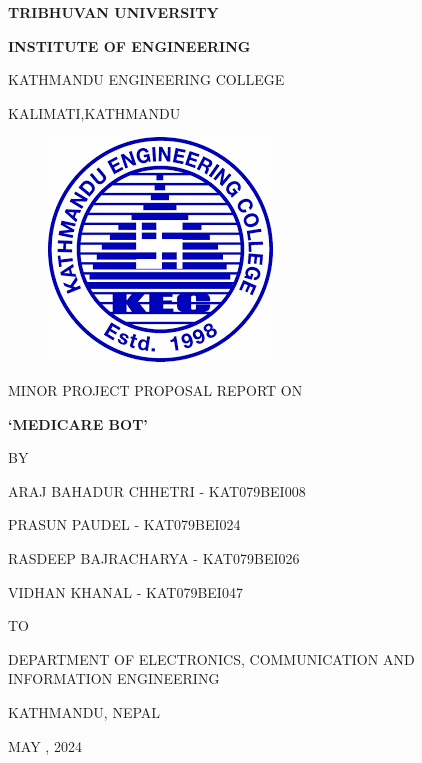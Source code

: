 \begin{titlepage}
    \thispagestyle{empty}
    \begin{center}
    
    \vspace*{\fill} %
    \vspace*{-1cm}
    {\large \textbf{TRIBHUVAN UNIVERSITY
}\par}
{\large \textbf{INSTITUTE OF ENGINEERING
}\par}
\vspace{8pt}
KATHMANDU ENGINEERING COLLEGE

KALIMATI,KATHMANDU
\vspace{24pt}

\begin{figure}[ht]
    \centering
    \includegraphics[scale=0.45]{images/kec.png}
\end{figure}
\vspace{24pt}
{MINOR PROJECT PROPOSAL REPORT ON\par}
\vspace{14pt}

{\textbf{ `MEDICARE BOT'}\par}



\vspace{14pt}
{BY\par}
\vspace{14pt}

{ ARAJ BAHADUR CHHETRI - KAT079BEI008\par}
{ PRASUN PAUDEL - KAT079BEI024\par}
{RASDEEP BAJRACHARYA - KAT079BEI026\par}
{VIDHAN KHANAL - KAT079BEI047\par}

\vspace{24pt}
{TO\par}
\vspace{14pt}
{DEPARTMENT OF ELECTRONICS, COMMUNICATION AND INFORMATION ENGINEERING\par}
{KATHMANDU, NEPAL\par}
{MAY , 2024\par}


    \end{center}
\end{titlepage}